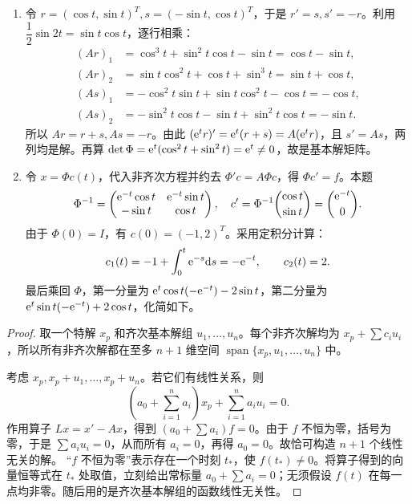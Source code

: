 \begin{enumerate}
\item 令 $r=(\cos t,\sin t)^T,s=(-\sin t,\cos t)^T$，于是 $r'=s,s'=-r$。利用 $\dfrac12\sin2t=\sin t\cos t$，逐行相乘：
\[
\begin{aligned}
(Ar)_1&=\cos^3t+\sin^2t\cos t-\sin t=\cos t-\sin t,\\
(Ar)_2&=\sin t\cos^2t+\cos t+\sin^3t=\sin t+\cos t,\\
(As)_1&=-\cos^2t\sin t+\sin t\cos^2t-\cos t=-\cos t,\\
(As)_2&=-\sin^2t\cos t-\sin t+\sin^2t\cos t=-\sin t.
\end{aligned}
\]
所以 $Ar=r+s,As=-r$。由此 $(\mathrm e^tr)'=\mathrm e^t(r+s)=A(\mathrm e^tr)$，且 $s'=As$，两列均是解。再算 $\det\Phi=\mathrm e^t(\cos^2t+\sin^2t)=\mathrm e^t\ne0$，故是基本解矩阵。
\item 令 $x=\Phi c(t)$，代入非齐次方程并约去 $\Phi'c=A\Phi c$，得 $\Phi c'=f$。本题
\[
\Phi^{-1}=\begin{pmatrix}\mathrm e^{-t}\cos t&\mathrm e^{-t}\sin t\\-\sin t&\cos t\end{pmatrix},
\quad c'=\Phi^{-1}\binom{\cos t}{\sin t}=\binom{\mathrm e^{-t}}0.
\]
由于 $\Phi(0)=I$，有 $c(0)=(-1,2)^T$。采用定积分计算：
\[
c_1(t)=-1+\int_0^t\mathrm e^{-s}\mathrm d s=-\mathrm e^{-t},\qquad c_2(t)=2.
\]
最后乘回 $\Phi$，第一分量为 $\mathrm e^t\cos t(-\mathrm e^{-t})-2\sin t$，第二分量为 $\mathrm e^t\sin t(-\mathrm e^{-t})+2\cos t$，化简如下。
\end{enumerate}
\begin{proof}
取一个特解 $x_p$ 和齐次基本解组 $u_1,\ldots,u_n$。每个非齐次解均为 $x_p+\sum c_iu_i$，所以所有非齐次解都在至多 $n+1$ 维空间 $\operatorname{span}\{x_p,u_1,\ldots,u_n\}$ 中。

考虑 $x_p,x_p+u_1,\ldots,x_p+u_n$。若它们有线性关系，则
\[
 \left(a_0+\sum_{i=1}^na_i\right)x_p+\sum_{i=1}^na_iu_i=0.
\]
作用算子 $Lx=x'-Ax$，得到 $(a_0+\sum a_i)f=0$。由于 $f$ 不恒为零，括号为零，于是 $\sum a_iu_i=0$，从而所有 $a_i=0$，再得 $a_0=0$。故恰可构造 $n+1$ 个线性无关的解。
“$f$ 不恒为零”表示存在一个时刻 $t_*$，使 $f(t_*)\ne0$。将算子得到的向量恒等式在 $t_*$ 处取值，立刻给出常标量 $a_0+\sum a_i=0$；无须假设 $f(t)$ 在每一点均非零。随后用的是齐次基本解组的函数线性无关性。
\end{proof}
